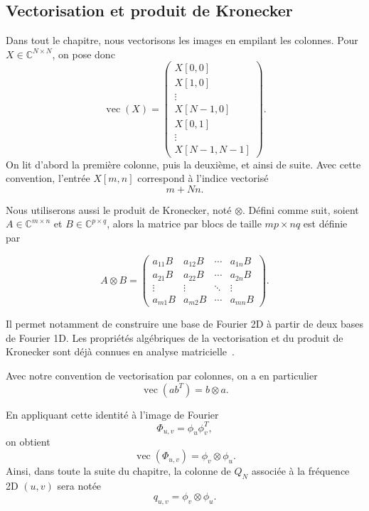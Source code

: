 \subsection{Vectorisation et produit de Kronecker}

Dans tout le chapitre, nous vectorisons les images en empilant les colonnes. Pour
$X\in\mathbb{C}^{N\times N}$, on pose donc
\begin{equation}
\operatorname{vec}(X)
=
\begin{pmatrix}
X[0,0] \\
X[1,0] \\
\vdots \\
X[N-1,0] \\
X[0,1] \\
\vdots \\
X[N-1,N-1]
\end{pmatrix}.
\label{eq:def_vectorisation_colonnes}
\end{equation}
On lit d'abord la première colonne, puis la deuxième, et ainsi de suite. Avec cette convention,
l'entrée $X[m,n]$ correspond à l'indice vectorisé
\[
    m+Nn.
\]

Nous utiliserons aussi le produit de Kronecker, noté $\otimes$. Défini comme suit, soient
$A \in \mathbb{C}^{m \times n}$ et $B \in \mathbb{C}^{p \times q}$, alors la matrice par blocs de taille
$mp \times nq$ est définie par

$$
A \otimes B =
\begin{pmatrix}
a_{11}B & a_{12}B & \cdots & a_{1n}B \\
a_{21}B & a_{22}B & \cdots & a_{2n}B \\
\vdots  & \vdots  & \ddots & \vdots  \\
a_{m1}B & a_{m2}B & \cdots & a_{mn}B
\end{pmatrix}.
$$

Il permet notamment de construire
une base de Fourier 2D à partir de deux bases de Fourier 1D. Les propriétés algébriques de la
vectorisation et du produit de Kronecker sont déjà connues en analyse matricielle~\cite{horn2013matrix}.

Avec notre convention de vectorisation par colonnes, on a en particulier
\begin{equation}
    \operatorname{vec}(ab^T)
    =
    b\otimes a.
    \label{eq:vec_produit_exterieur}
\end{equation}

En appliquant cette identité à l'image de Fourier
\[
    \Phi_{u,v}=\phi_u\phi_v^T,
\]
on obtient
\begin{equation}
    \operatorname{vec}(\Phi_{u,v})
    =
    \phi_v\otimes\phi_u.
    \label{eq:vec_fourier_2d}
\end{equation}
Ainsi, dans toute la suite du chapitre, la colonne de $Q_N$ associée à la fréquence 2D $(u,v)$ sera notée
\[
    q_{u,v}
    =
    \phi_v\otimes\phi_u.
\]

